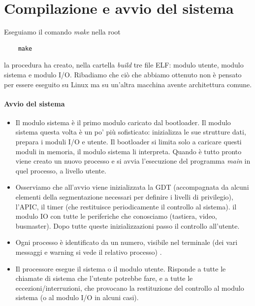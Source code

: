 \section{Compilazione e avvio del sistema}
Eseguiamo il comando \emph{make} nella root
\begin{verbatim}
	make
\end{verbatim}
la procedura ha creato, nella cartella \emph{build} tre file ELF: modulo utente, modulo sistema e modulo I/O. Ribadiamo che ciò che abbiamo ottenuto non è pensato per essere eseguito su Linux ma su un'altra macchina avente architettura comune.


\paragraph{Avvio del sistema}
\begin{itemize}
	\item Il modulo sistema è il primo modulo caricato dal bootloader. Il modulo sistema questa volta è un po' più sofisticato: inizializza le sue strutture dati, prepara i moduli I/O e utente. Il bootloader si limita solo a caricare questi moduli in memoria, il modulo sistema li interpreta. Quando è tutto pronto viene creato un nuovo processo e si avvia l'esecuzione del programma \emph{main} in quel processo, a livello utente. 
	\item Osserviamo che all'avvio viene inizializzata la GDT (accompagnata da alcuni elementi della segmentazione necessari per definire i livelli di privilegio), l'APIC, il timer (che restituisce periodicamente il controllo al sistema). il modulo IO con tutte le periferiche che conosciamo (tastiera, video, busmaster). Dopo tutte queste inizializzazioni passo il controllo all'utente.
	\item Ogni processo è identificato da un numero, visibile nel terminale (dei vari messaggi e warning si vede il relativo processo) .
	\item Il processore esegue il sistema o il modulo utente. Risponde a tutte le chiamate di sistema che l'utente potrebbe fare, e a tutte le eccezioni/interruzioni, che provocano la restituzione del controllo al modulo sistema (o al modulo I/O in alcuni casi).
\end{itemize}

